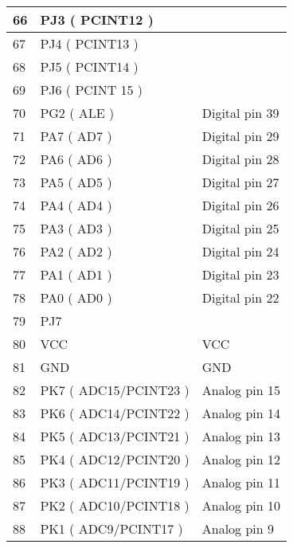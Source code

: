 \begin{longtable}[c]{|l|l|l|}
    66         & PJ3 ( PCINT12 )          &                       \\ \hline
    67         & PJ4 ( PCINT13 )          &                       \\ \hline
    68         & PJ5 ( PCINT14 )          &                       \\ \hline
    69         & PJ6 ( PCINT 15 )         &                       \\ \hline
    70         & PG2 ( ALE )              & Digital pin 39        \\ \hline
    71         & PA7 ( AD7 )              & Digital pin 29        \\ \hline
    72         & PA6 ( AD6 )              & Digital pin 28        \\ \hline
    73         & PA5 ( AD5 )              & Digital pin 27        \\ \hline
    74         & PA4 ( AD4 )              & Digital pin 26        \\ \hline
    75         & PA3 ( AD3 )              & Digital pin 25        \\ \hline
    76         & PA2 ( AD2 )              & Digital pin 24        \\ \hline
    77         & PA1 ( AD1 )              & Digital pin 23        \\ \hline
    78         & PA0 ( AD0 )              & Digital pin 22        \\ \hline
    79         & PJ7                      &                       \\ \hline
    80         & VCC                      & VCC                   \\ \hline
    81         & GND                      & GND                   \\ \hline
    82         & PK7 ( ADC15/PCINT23 )    & Analog pin 15         \\ \hline
    83         & PK6 ( ADC14/PCINT22 )    & Analog pin 14         \\ \hline
    84         & PK5 ( ADC13/PCINT21 )    & Analog pin 13         \\ \hline
    85         & PK4 ( ADC12/PCINT20 )    & Analog pin 12         \\ \hline
    86         & PK3 ( ADC11/PCINT19 )    & Analog pin 11         \\ \hline
    87         & PK2 ( ADC10/PCINT18 )    & Analog pin 10         \\ \hline
    88         & PK1 ( ADC9/PCINT17 )     & Analog pin 9          \\ \hline

\end{longtable}
